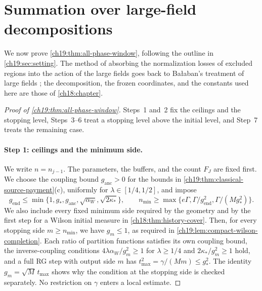 \section{Summation over large-field decompositions}\label{ch19:sec:summation}

We now prove \cref{ch19:thm:all-phase-window}, following the outline in \cref{ch19:sec:setting}. The method of absorbing the normalization losses of excluded regions into the action of the large fields goes back to Bałaban's treatment of large fields \cite{Balaban1989LargeI,Balaban1989LargeII}; the decomposition, the frozen coordinates, and the constants used here are those of \cref{ch18:chapter}.

\begin{proof}[Proof of \cref{ch19:thm:all-phase-window}]
Steps~1 and~2 fix the ceilings and the stopping level, Steps~3--6 treat a stopping level above the initial level, and Step~7 treats the remaining case.

\paragraph{Step 1: ceilings and the minimum side.}
We write $n=n_{j-1}$. The parameters, the buffers, and the count $F_J$ are fixed first. We choose the coupling bound $g_{\mathrm{anc}}>0$ for the bounds in \cref{ch19:thm:classical-source-payment}(c), uniformly for $\lambda\in[1/4,1/2]$, and impose
\begin{equation}\label{ch19:eq:window-endpoint-gates}
 g_{\mathrm{end}}\le\min\{1,g_*,g_{\mathrm{anc}},\sqrt{\alpha_W},\sqrt{2\kappa_*}\},\qquad
 n_{\min}\ge\max\{e\Gamma,\Gamma/g_{\mathrm{end}}^2,\Gamma/(Mg_*^2)\}.
\end{equation}
We also include every fixed minimum side required by the geometry and by the first step for a Wilson initial measure in \cref{ch18:thm:history-cover}. Then, for every stopping side $m\ge n_{\min}$, we have $g_m\le1$, as required in \cref{ch19:lem:compact-wilson-completion}. Each ratio of partition functions satisfies its own coupling bound, the inverse-coupling conditions $4\lambda\alpha_W/g_m^2\ge1$ for $\lambda\ge1/4$ and $2\kappa_*/g_m^2\ge1$ hold, and a full RG step with output side $m$ has $t_{\max}^2=\gamma/(Mm)\le g_*^2$. The identity $g_m=\sqrt M\,t_{\max}$ shows why the condition at the stopping side is checked separately. No restriction on $\gamma$ enters a local estimate.


\end{proof}
